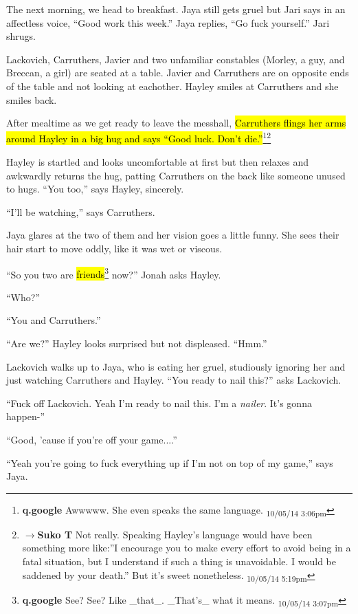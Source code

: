 The next morning, we head to breakfast.  Jaya still gets gruel but Jari says in an affectless voice, ``Good work this week.''  Jaya replies, ``Go fuck yourself.''  Jari shrugs.



Lackovich, Carruthers, Javier and two unfamiliar constables (Morley, a guy, and Breccan, a girl) are seated at a table.  Javier and Carruthers are on opposite ends of the table and not looking at eachother.  Hayley smiles at Carruthers and she smiles back.  

After mealtime as we get ready to leave the messhall, \hl{Carruthers flings her arms around Hayley in a big hug and says ``Good luck.  Don't die.''}\footnote{\textbf{q.google }Awwwww.  She even speaks the same language. \textsubscript{10/05/14 3:06pm}}\footnote{$\rightarrow$\textbf{Suko T }Not really.  Speaking Hayley's language would have been something more like:''I encourage you to make every effort to avoid being in a fatal situation, but I understand if such a thing is unavoidable.  I would be saddened by your death.''  But it's sweet nonetheless. \textsubscript{10/05/14 5:19pm}}

Hayley is startled and looks uncomfortable at first but then relaxes and awkwardly returns the hug, patting Carruthers on the back like someone unused to hugs.  ``You too,'' says Hayley, sincerely.

``I'll be watching,'' says Carruthers.

Jaya glares at the two of them and her vision goes a little funny.  She sees their hair start to move oddly, like it was wet or viscous.

``So you two are \hl{friends}\footnote{\textbf{q.google }See?  See?  Like \_that\_.  \_That's\_ what it means. \textsubscript{10/05/14 3:07pm}} now?'' Jonah asks Hayley.

``Who?''

``You and Carruthers.''

``Are we?'' Hayley looks surprised but not displeased.  ``Hmm.''

Lackovich walks up to Jaya, who is eating her gruel, studiously ignoring her and just watching Carruthers and Hayley.  ``You ready to nail this?'' asks Lackovich.

``Fuck off Lackovich.  Yeah I'm ready to nail this.  I'm a \textit{nailer}.  It's gonna happen-''

``Good, 'cause if you're off your game....''

``Yeah you're going to fuck everything up if I'm not on top of my game,'' says Jaya.

